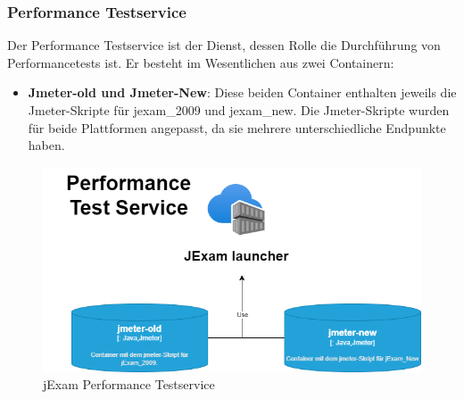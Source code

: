 \subsubsection{Performance Testservice}

Der Performance Testservice ist der Dienst, dessen Rolle die
Durchführung von Performancetests ist. Er besteht im Wesentlichen
aus zwei Containern:

\begin{itemize}
    \setlength\itemsep{1em}

    \item[] \textbf{Jmeter-old und Jmeter-New}: Diese beiden Container enthalten jeweils
    die Jmeter-Skripte für \gls{jexam_2009} und \gls{jexam_new}. Die
    Jmeter-Skripte wurden für beide Plattformen angepasst, da sie
    mehrere unterschiedliche Endpunkte haben.

\end{itemize}

\begin{figure}[H]
    \centering
    \includegraphics[scale=0.6]{images/performance.drawio}
    \caption{jExam Performance Testservice} \label{fig:per}
\end{figure}